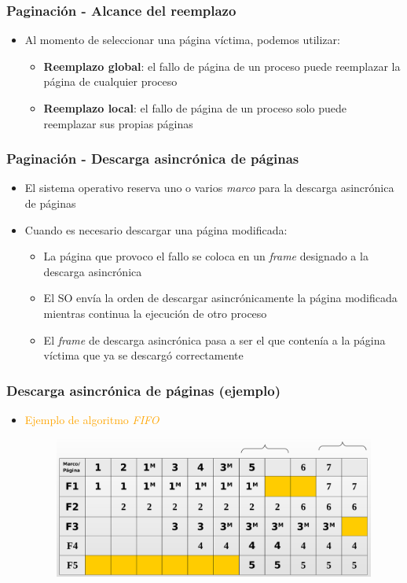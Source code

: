 \begin{frame}
  \frametitle{Paginación - Alcance del reemplazo}
  \begin{itemize}
  	\item Al momento de seleccionar una página víctima, podemos utilizar:
  	\begin{itemize}
  		\item \textbf{Reemplazo global}: el fallo de página de un proceso puede reemplazar la página de cualquier proceso
		\item \textbf{Reemplazo local}: el fallo de página de un proceso solo puede reemplazar sus propias páginas
  	\end{itemize}
  \end{itemize}
\end{frame}

\begin{frame}
  \frametitle{Paginación - Descarga asincrónica de páginas}
  \begin{itemize}
  	\item El sistema operativo reserva uno o varios \emph{marco} para la descarga asincrónica de páginas
  	\item Cuando es necesario descargar una página modificada:
  	\begin{itemize}
  		\item La página que provoco el fallo se coloca en un \emph{frame} designado a la descarga asincrónica
		\item El SO envía la orden de descargar asincrónicamente la página modificada mientras continua la ejecución de otro proceso
		\item El \emph{frame} de descarga asincrónica pasa a ser el que contenía a la página víctima que ya se descargó correctamente
  	\end{itemize}
  \end{itemize}
\end{frame}

\begin{frame}
  \frametitle{Descarga asincrónica de páginas (ejemplo)}
  \begin{itemize}
  	\item \textcolor{orange}{Ejemplo de algoritmo \emph{FIFO}}
	\begin{figure}
	    \includegraphics[scale=0.2]{images/asyncDownload.png}
	\end{figure}  	
  \end{itemize}
\end{frame}


